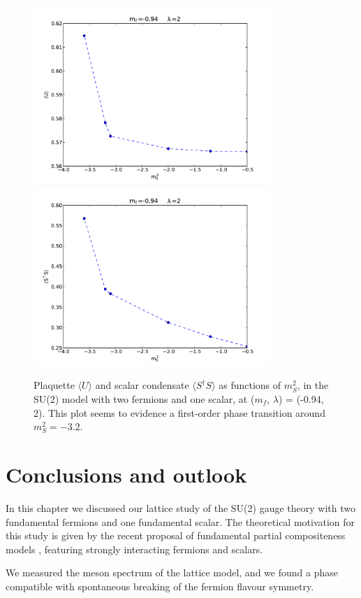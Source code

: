 \begin{figure}[thb] 
\begin{adjustwidth}{-4em}{-4em}
  \includegraphics[width=9cm,clip]{pics/jump_plaquette}\includegraphics[width=9cm,clip]{pics/jump_condensate}
\end{adjustwidth}
  \caption{Plaquette $\langle U \rangle$ and scalar condensate $\langle S^{\dagger} S \rangle$ as functions of $m_S^2$, in the SU(2) model with two fermions and one scalar, at ($m_f$, $\lambda$) = (-0.94, 2). This plot seems to evidence a first-order phase transition around $m_S^2 = -3.2$.}
  \label{jump_pl_cond}
\end{figure}



\section{Conclusions and outlook}

In this chapter we discussed our lattice study of the SU(2) gauge theory with two fundamental fermions and one fundamental scalar. The theoretical motivation for this study is given by the recent proposal of fundamental partial compositeness models \cite{Sannino:2016sfx}, featuring strongly interacting fermions and scalars.

We measured the meson spectrum of the lattice model, and we found a phase compatible with spontaneous breaking of the fermion flavour symmetry. 


